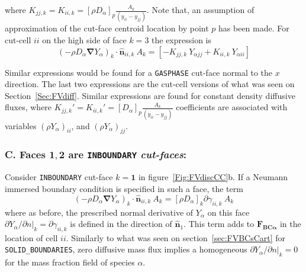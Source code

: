 \documentclass[12pt]{article}
\begin{document}
%
where $K_{jj,k}=K_{ii,k}=[ \rho D_\alpha ]_p \frac{A_k}{(y_{ii}-y_{jj})}$. Note that, an assumption of approximation of the cut-face centroid location by point $p$ has been made. For cut-cell $ii$ on the high side of face $k=3$ the expression is
%
\begin{equation}
  \left( - \rho D_\alpha \boldsymbol{\nabla} Y_\alpha \right)_k \cdot \hat{\mathbf{n}}_{ii,k} \: A_k =
  \left[  -K_{jj,k} \: Y_{\alpha jj} +  K_{ii,k} \: Y_{\alpha ii} \right]
\end{equation}
%

Similar expressions would be found for a \texttt{GASPHASE} cut-face normal to the $x$ direction. The last two expressions are the cut-cell versions of what was seen on Section~\ref{Sec:FVdiff}. Similar expressions are found for constant density diffusive fluxes, where $K_{jj,k}'=K_{ii,k}'=[D_\alpha ]_p \frac{A_k}{(y_{ii}-y_{jj})}$ coefficients are associated with variables $\left( \rho Y_{\alpha} \right)_{ii}$, and $\left( \rho Y_{\alpha} \right)_{jj}$.


\subsubsection*{C. Faces $\mathbf{1},\mathbf{2}$ are \texttt{INBOUNDARY} \textit{cut-faces}:}

Consider \texttt{INBOUNDARY} cut-face $k=\mathbf{1}$ in figure~\ref{Fig:FVdiscCC}b. If a Neumann immersed boundary condition is specified in such a face, the term
%
\begin{equation}
  \left( - \rho D_\alpha \boldsymbol{\nabla} Y_\alpha \right)_k \cdot \hat{\mathbf{n}}_{ii,k} \: A_k = [\rho D_\alpha]_k \partial \gamma_{ii,k} \: A_k
\end{equation}
%
where as before, the prescribed normal derivative of $Y_\alpha$ on this face $\partial Y_\alpha / \partial n |_k=\partial  \gamma_{ii,k}$ is defined in the direction of $\hat{\mathbf{n}}_1$.
This term adds to $\mathbf{F_{BC \alpha}}$ in the location of cell $ii$. Similarly to what was seen on section~\ref{sec:FVBCsCart} for \texttt{SOLID\_BOUNDARIES}, zero diffusive mass flux implies a homogeneous $\partial Y_\alpha / \partial n |_k=0$ for the mass fraction field of species $\alpha$.



\end{document}
